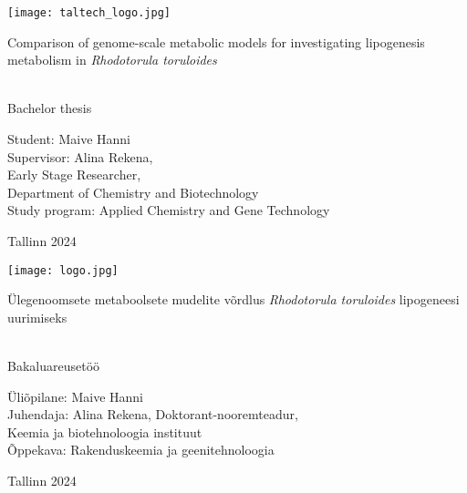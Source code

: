 \documentclass[a4paper, 11pt]{report}
\begin{document}
\begin{titlepage}
    \texttt{[image: taltech\_logo.jpg]}

    \begin{center}
        \vspace{35mm}
        \begin{LARGE}
            Comparison of genome-scale metabolic models for investigating 
            lipogenesis metabolism in \textit{Rhodotorula toruloides}
        \end{LARGE} \\
             Bachelor thesis

        \vspace{30mm}
        \hfill
        \parbox{50mm}{
            Student: Maive Hanni \\
            Supervisor: Alina Rekena, \\
            Early Stage Researcher, \\
            Department of Chemistry and Biotechnology \\
            Study program: Applied Chemistry and Gene Technology
            }

            


        \vfill
        Tallinn 2024
    \end{center}
\end{titlepage}

\begin{titlepage}
    \texttt{[image: logo.jpg]}

    \begin{center}
        \vspace{35mm}
        \begin{LARGE}
            Ülegenoomsete metaboolsete mudelite võrdlus \textit{Rhodotorula toruloides} lipogeneesi uurimiseks
        \end{LARGE} \\
            Bakaluareusetöö

        \vspace{30mm}
        \hfill
        \parbox{50mm}{
            Üliõpilane: Maive Hanni \\
            Juhendaja: Alina Rekena,
            Doktorant-nooremteadur, \\ 
            Keemia ja biotehnoloogia instituut \\ 
            Õppekava: Rakenduskeemia ja geenitehnoloogia
            }

        \vfill
        Tallinn 2024
    \end{center}
\end{titlepage}
\end{document}
